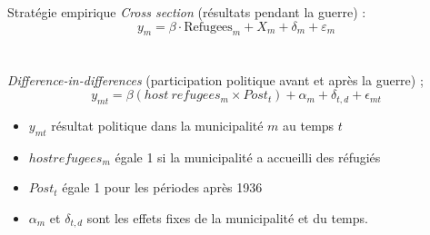 \documentclass[xcolor=dvipsnames, aspectratio=169]{beamer}
\begin{document}
\begin{frame}{Stratégie empirique}
\textit{Cross section} (résultats pendant la guerre) : 
\begin{equation}\label{equation:refugees_resistance}
    y_{m} = \beta \cdot \text{Refugees}_{m} + X_{m} + \delta_{m} + \varepsilon_{m}
\end{equation}
\\
\vspace{0.2in}
\\
\textit{Difference-in-differences} (participation politique avant et après la guerre) ;
\begin{equation}
     y_{mt} = \beta (host \ refugees_{m} \times Post_t)+ \alpha_{m} + \delta_{t,d} + \epsilon_{mt}
\end{equation}

\begin{itemize}
    \item  $y_{mt}$  résultat politique dans la municipalité $m$ au temps $t$
    \item $host refugees_{m}$ égale 1 si la municipalité a accueilli des réfugiés
    \item $Post_t$ égale 1 pour les périodes après 1936
    \item $\alpha_{m}$ et $\delta_{t,d}$ sont les effets fixes de la municipalité et du temps.
\end{itemize}


\end{frame}

 
\end{document}
